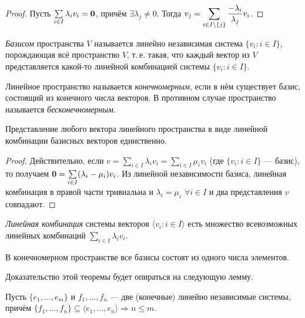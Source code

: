 \begin{proof}
    Пусть $\sum\limits_{i \in I}\lambda_iv_i = \boldsymbol{0}$, причём $\exists\lambda_j \ne 0$. Тогда $\displaystyle v_j = \sum_{i \in I \setminus \{j\}}\frac{-\lambda_i}{\lambda_j}v_i$.
\end{proof}

\begin{definition}
    \textit{Базисом} пространства $V$ называется линейно независимая система $\{v_i : i \in I\}$, порождающая всё пространство $V$, т.\,е. такая, что каждый вектор из $V$ представляется какой-то линейной комбинацией системы $\{v_i : i \in I\}$.
\end{definition}

\begin{definition}
    Линейное пространство называется \textit{конечномерным}, если в нём существует базис, состоящий из конечного числа векторов. В противном случае пространство называется \textit{бесконечномерным}.
\end{definition}

\begin{proposal}
    Представление любого вектора линейного пространства в виде линейной комбинации базисных векторов единственно.
\end{proposal}

\begin{proof}
    Действительно, если $v = \sum\limits_{i \in I}\lambda_iv_i = \sum\limits_{i \in I}\mu_iv_i$ (где $\{v_i : i \in I\}$ --- базис), то получаем $\boldsymbol{0} = \sum\limits_{i \in I}(\lambda_i - \mu_i)v_i$. Из линейной независимости базиса, линейная комбинация в правой части тривиальна и $\lambda_i = \mu_i$ $\forall i \in I$ и два представления $v$ совпадают.
\end{proof}

\begin{definition}
    \textit{Линейная комбинация} системы векторов $\langle v_i : i \in I \rangle$ есть множество всевозможных линейных комбинаций $\sum\limits_{i \in I}\lambda_iv_i$.
\end{definition}

\begin{theorem}
    В конечномерном пространстве все базисы состоят из одного числа элементов.
\end{theorem}

Доказательство этой теоремы будет опираться на следующую лемму.

\begin{lemma}
    Пусть $\{e_1, \ldots, e_m\}$ и $f_1, \ldots, f_n$ --- две (конечные) линейно независимые системы, причём $\{f_1, \ldots, f_n\} \subseteq \langle e_1, \ldots, e_n\rangle \Rightarrow n \leqslant m$.
\end{lemma}

